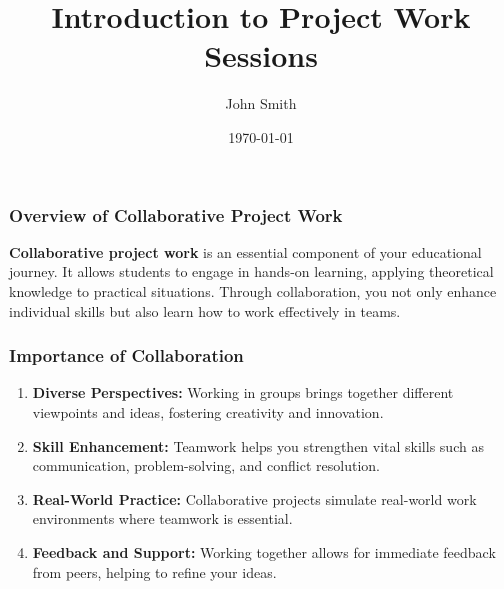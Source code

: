 \documentclass[aspectratio=169]{beamer}
\begin{document}
\frame{\titlepage}

\begin{frame}[fragile]
    \title{Introduction to Project Work Sessions}
    \author{John Smith}
    \date{\today}
    \maketitle
\end{frame}

\begin{frame}[fragile]
    \frametitle{Overview of Collaborative Project Work}
    \begin{block}{}
        \textbf{Collaborative project work} is an essential component of your educational journey. 
        It allows students to engage in hands-on learning, applying theoretical knowledge to practical situations. 
        Through collaboration, you not only enhance individual skills but also learn how to work effectively in teams. 
    \end{block}
\end{frame}

\begin{frame}[fragile]
    \frametitle{Importance of Collaboration}
    \begin{enumerate}
        \item \textbf{Diverse Perspectives:} Working in groups brings together different viewpoints and ideas, fostering creativity and innovation.

        \item \textbf{Skill Enhancement:} Teamwork helps you strengthen vital skills such as communication, problem-solving, and conflict resolution.
        
        \item \textbf{Real-World Practice:} Collaborative projects simulate real-world work environments where teamwork is essential.
        
        \item \textbf{Feedback and Support:} Working together allows for immediate feedback from peers, helping to refine your ideas.
    \end{enumerate}
\end{frame}
\end{document}

